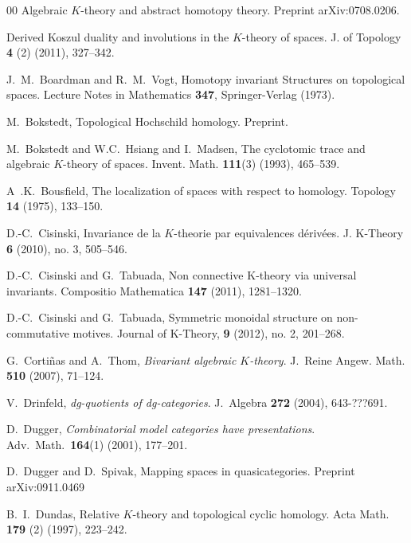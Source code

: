 \documentclass{amsart}
\numberwithin{equation}{section}
\theoremstyle{definition}
\begin{document}
\begin{thebibliography}{00}
 \bysame
\newblock Algebraic {$K$}-theory and abstract homotopy theory.
\newblock Preprint arXiv:0708.0206.

\bysame
\newblock Derived {K}oszul duality and involutions in the {$K$}-theory
of spaces.
\newblock J. of Topology {\bf 4} (2) (2011), 327--342.

 J.~M.~Boardman and R.~M.~Vogt, 
\newblock Homotopy invariant Structures on topological spaces. 
\newblock Lecture Notes in Mathematics {\bf 347}, Springer-Verlag
(1973).

 M.~Bokstedt,
\newblock Topological {H}ochschild homology.
\newblock Preprint.

 M.~Bokstedt and W.C.~Hsiang and
I.~Madsen,
\newblock The cyclotomic trace and algebraic {$K$}-theory of spaces.
\newblock Invent. Math. {\bf 111}(3) (1993), 465--539.

 A~.K.~Bousfield, 
\newblock The localization of spaces with respect to homology.
\newblock Topology {\bf 14} (1975), 133--150.

D.-C.~Cisinski,
\newblock Invariance de la {$K$}-theorie par equivalences d\'eriv\'ees.
\newblock J. K-Theory {\bf 6} (2010), no. 3, 505--546.

 D.-C.~Cisinski and G.~Tabuada,
\newblock Non connective K-theory via universal invariants.
\newblock Compositio Mathematica {\bf 147} (2011), 1281--1320.
 
 D.-C.~Cisinski and G.~Tabuada,
\newblock Symmetric monoidal structure on non-commutative motives.
\newblock Journal of K-Theory, {\bf 9} (2012), no. 2, 201--268.

 G.~Corti{\~n}as and A.~Thom, {\em Bivariant
algebraic $K$-theory}. J.~Reine Angew. Math. {\bf 510} (2007),
71--124.

 V.~Drinfeld, {\em dg-quotients of dg-categories}.
J.~Algebra {\bf 272} (2004), 643-???691.

 D.~Dugger, {\em Combinatorial model categories have
  presentations}.  Adv.\ Math.\ {\bf 164}(1) (2001), 177--201.

 D.~Dugger and D.~Spivak,
\newblock Mapping spaces in quasicategories.
\newblock Preprint arXiv:0911.0469

 B.~I.~Dundas,
\newblock Relative {$K$}-theory and topological cyclic homology.
\newblock Acta Math. {\bf 179} (2) (1997), 223--242.


\end{thebibliography}
\end{document}
